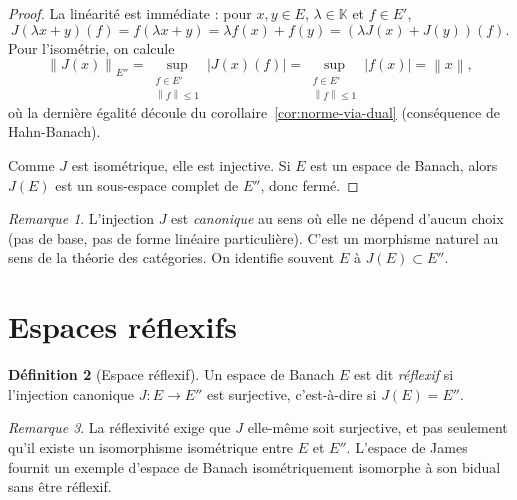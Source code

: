 \documentclass[a4paper,12pt]{book}
\newcommand{\K}{\mathbb{K}}
\newcommand{\norm}[1]{\left\| #1 \right\|}
\newcommand{\abs}[1]{\left| #1 \right|}
\theoremstyle{definition}
\newtheorem{definition}{Définition}[chapter]
\theoremstyle{plain}
\theoremstyle{remark}
\newtheorem{remarque}[definition]{Remarque}
\begin{document}
\begin{proof}
La linéarité est immédiate : pour $x, y \in E$, $\lambda \in \K$ et $f \in E'$,
\[
  J(\lambda x + y)(f) = f(\lambda x + y) = \lambda f(x) + f(y) = (\lambda J(x) + J(y))(f).
\]
Pour l'isométrie, on calcule
\[
  \norm{J(x)}_{E''} = \sup_{\substack{f \in E' \\ \norm{f} \le 1}} \abs{J(x)(f)}
  = \sup_{\substack{f \in E' \\ \norm{f} \le 1}} \abs{f(x)} = \norm{x},
\]
où la dernière égalité découle du corollaire~\ref{cor:norme-via-dual} (conséquence de
Hahn-Banach).

Comme $J$ est isométrique, elle est injective. Si $E$ est un espace de Banach, alors
$J(E)$ est un sous-espace complet de $E''$, donc fermé.
\end{proof}

\begin{remarque}
\label{rem:J-naturelle}
L'injection $J$ est \emph{canonique} au sens où elle ne dépend d'aucun choix
(pas de base, pas de forme linéaire particulière). C'est un morphisme naturel
au sens de la théorie des catégories. On identifie
souvent $E$ à $J(E) \subset E''$.
\end{remarque}


\section{Espaces réflexifs}
\label{sec:reflexifs}


\begin{definition}[Espace réflexif]
\label{def:reflexif}
Un espace de Banach $E$ est dit \emph{réflexif} si l'injection canonique
$J : E \to E''$ est surjective, c'est-à-dire si $J(E) = E''$.
\end{definition}

\begin{remarque}
\label{rem:reflexif-surjectif}
La réflexivité exige que $J$ elle-même soit surjective, et pas seulement qu'il
existe un isomorphisme isométrique entre $E$ et $E''$. L'espace de James
fournit un exemple d'espace de Banach isométriquement isomorphe à son bidual sans être réflexif.
\end{remarque}
\end{document}

